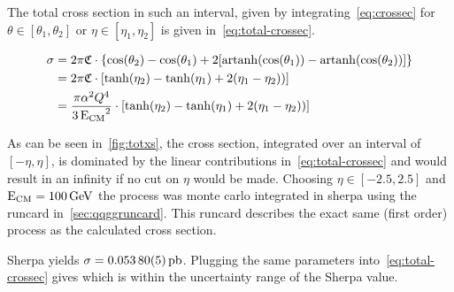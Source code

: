 The total cross section in such an interval, given by
integrating~\eqref{eq:crossec} for \(\theta\in [\theta_1, \theta_2]\)
or \(\eta\in [\eta_1, \eta_2]\) is given
in~\eqref{eq:total-crossec}.

\begin{equation}
  \label{eq:total-crossec}
  \begin{split}
  \sigma &=
  2\pi\mathfrak{C}\cdot\qty{\cos(\theta_2)-\cos(\theta_1)+2\qty[\operatorname{artanh}(\cos(\theta_1))
    - \operatorname{artanh}(\cos(\theta_2))]} \\
  &=2\pi\mathfrak{C}\cdot\qty[\tanh(\eta_2) - \tanh(\eta_1) + 2(\eta_1
  - \eta_2))] \\
  &={\frac{\pi\alpha^2Q^4}{3\operatorname{E_{\text{CM}}}^2}}\cdot\qty[\tanh(\eta_2) - \tanh(\eta_1) + 2(\eta_1
  - \eta_2))]
  \end{split}
\end{equation}

As can be seen in~\ref{fig:totxs}, the cross section, integrated over
an interval of \([-\eta, \eta]\), is dominated by the linear
contributions in~\ref{eq:total-crossec} and would result in an
infinity if no cut on \(\eta\) would be made.  Choosing
\(\eta\in [-2.5,2.5]\) and \(\operatorname{E_{\text{CM}}}=\SI{100}{\giga\electronvolt}\) the
process was monte carlo integrated in sherpa using the runcard
in~\ref{sec:qqggruncard}. This runcard describes the exact same (first
order) process as the calculated cross section.

Sherpa yields \(\sigma = \SI{0.05380\pm
  .00005}{\pico\barn}\). Plugging the same parameters
into~\eqref{eq:total-crossec} gives  which is
within the uncertainty range of the Sherpa value.
